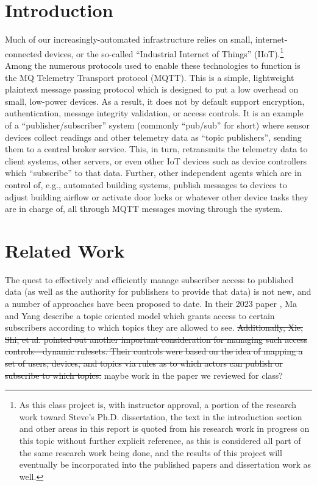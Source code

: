 \documentclass[sigconf, nonacm]{acmart}
\begin{document}
\section{Introduction}
Much of our increasingly-automated infrastructure relies on small, internet-connected devices, or the so-called ``Industrial Internet of Things'' (IIoT).\footnote{As this class project is, with instructor approval, a portion
of the research work toward Steve's Ph.D. dissertation, the text in the introduction section and other areas in this report is quoted from his research work in progress on this topic without further explicit reference, as this is considered all part of the same research work being done, and the results of this project will eventually be incorporated into the published papers and dissertation work as well.}
Among the numerous protocols used to enable these technologies to function is the MQ Telemetry Transport protocol (MQTT). This is a simple,
lightweight plaintext message passing protocol which is designed to put a low overhead on small, low-power devices. As a result, it does not by default
support encryption, authentication, message integrity validation, or access controls. It is an example of a ``publisher/subscriber'' system 
(commonly ``pub/sub'' for short) where sensor devices collect readings and other telemetry data as ``topic publishers'', sending them to a central broker service. This, in turn, retransmits the telemetry data to client systems, other servers, or even other IoT devices such as device controllers which
``subscribe'' to that data. Further, other independent agents which are in control of, e.g., automated building systems, publish messages to devices to adjust
building airflow or activate door locks or whatever other device tasks they are in charge of, all through MQTT messages moving through the system.

\section{Related Work}
The quest to effectively and efficiently manage subscriber access to published data (as well as the authority for publishers to provide that
data) is not new, and a number of approaches have been proposed to date. In their 2023 paper \cite{ma2022tbac}, Ma and Yang describe a topic
oriented model which grants access to certain subscribers according to which topics they are allowed to see.  \sout{Additionally, Xie, Shi, et al. pointed
out \cite{xie2020topic} another important consideration for managing such access controls---dynamic rulesets. Their controls were based on the idea
of mapping a set of users, devices, and topics via rules as to which actors can publish or subscribe to which topics.}
{\color{red}maybe work in the paper we reviewed for class?}
\end{document}
